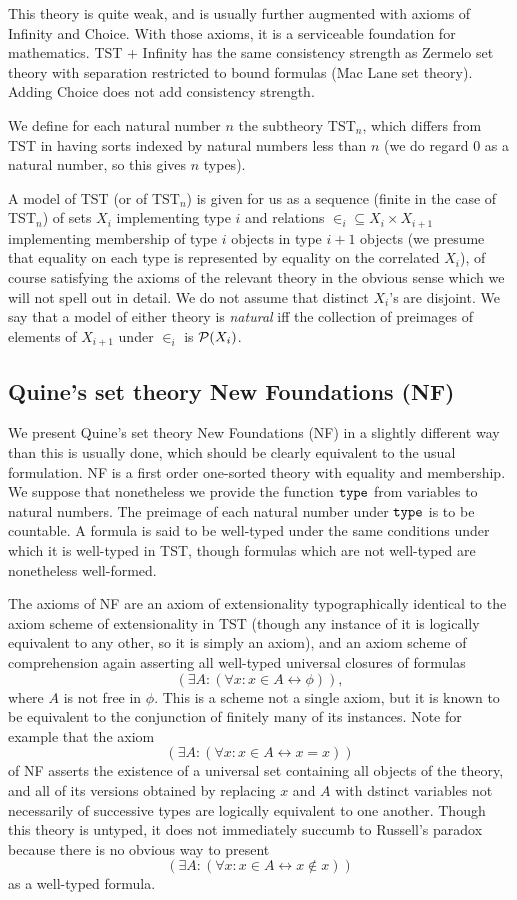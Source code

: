 \documentclass[12pt]{article}
\begin{document}
This theory is quite weak, and is usually further augmented with axioms of Infinity and Choice.  With those axioms, it is a serviceable foundation for mathematics.  TST + Infinity has the same consistency strength as Zermelo set theory with separation restricted to bound formulas (Mac Lane set theory).  Adding Choice does not add consistency strength.

We define for each natural number $n$ the subtheory TST$_n$, which differs from TST in having sorts indexed by natural numbers less than $n$ (we do regard 0 as a natural number, so this gives $n$ types).

A model of TST (or of TST$_n$) is given for us as a sequence (finite in the case of TST$_n$)  of sets $X_i$ implementing type $i$ and relations $\in_i \subseteq X_i \times X_{i+1}$ implementing membership of type $i$ objects in type $i+1$ objects (we presume that equality on each type is represented by equality on the correlated $X_i$), of course satisfying the axioms of the relevant theory in the obvious sense which we will not spell out in detail.   We do not assume that distinct $X_i$'s are disjoint.  We say that a model of either theory is {\em natural\/} iff the collection of preimages of elements of $X_{i+1}$ under $\in_i$ is ${\cal P}(X_i)$.

\subsection{Quine's set theory New Foundations (NF)}

We present Quine's set theory New Foundations (NF) in a slightly different way than this is usually done, which should be clearly equivalent to the usual formulation.
NF is a first order one-sorted theory with equality and membership.  We suppose that nonetheless we provide the function ${\tt type}$ from variables to natural numbers.
The preimage of each natural number under ${\tt type}$ is to be countable.  A formula is said to be well-typed under the same conditions under which it is well-typed in TST, though formulas which are not well-typed are nonetheless well-formed.

The axioms of NF are an axiom of extensionality typographically identical to the axiom scheme of extensionality in TST (though any instance of it is logically equivalent to any other, so it is simply an axiom), and an axiom scheme of comprehension again asserting all well-typed universal closures of formulas
$$(\exists A:(\forall x:x \in A \leftrightarrow \phi)),$$  where $A$ is not free in $\phi$.  This is a scheme not a single axiom, but it is known to be equivalent to the conjunction of finitely many of its instances.  Note for example that the axiom $$(\exists A:(\forall x:x \in A \leftrightarrow x=x))$$ of NF asserts the existence of a universal set containing all objects of the theory, and all of its versions obtained by replacing $x$ and $A$ with dstinct variables not necessarily of  successive types are logically equivalent to one another.   Though this theory is untyped, it does not immediately succumb to Russell's paradox because there is no obvious way to present $$(\exists A:(\forall x:x \in A \leftrightarrow x \not\in x))$$ as a well-typed formula.
\end{document}
